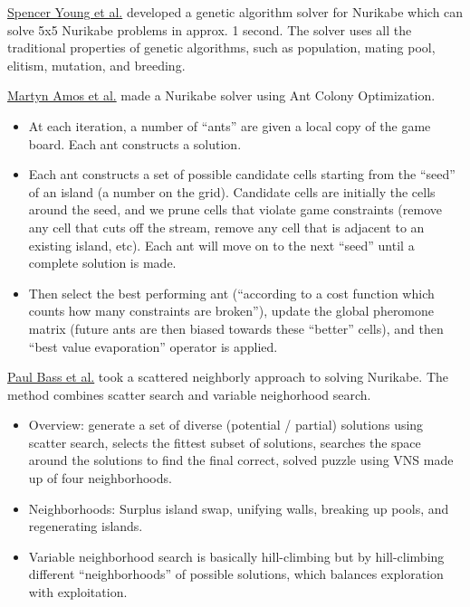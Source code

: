 \documentclass{article}
\theoremstyle{definition}
\begin{document}
\hyperlink{http://www.spenceryoungcs.com/nurikabeGA.html}{Spencer Young et al.} developed a genetic algorithm solver for Nurikabe which can solve 5x5 Nurikabe problems in approx. 1 second. The solver uses all the traditional properties of genetic algorithms, such as population, mating pool, elitism, mutation, and breeding.

\hyperlink{https://dl.acm.org/doi/10.1145/3319619.3338470}{Martyn Amos et al.} made a Nurikabe solver using Ant Colony Optimization. 
\begin{itemize}
  \item At each iteration, a number of “ants” are given a local copy of the game board. Each ant constructs a solution.
  \item Each ant constructs a set of possible candidate cells starting from the “seed” of an island (a number on the grid). Candidate cells are initially the cells around the seed, and we prune cells that violate game constraints (remove any cell that cuts off the stream, remove any cell that is adjacent to an existing island, etc). Each ant will move on to the next “seed” until a complete solution is made.
  \item Then select the best performing ant (“according to a cost function which counts how many constraints are broken”), update the global pheromone matrix (future ants are then biased towards these “better” cells), and then “best value evaporation” operator is applied.
\end{itemize}

\hyperlink{https://dl.acm.org/doi/pdf/10.5555/3447286.3447294}{Paul Bass et al.} took a scattered neighborly approach to solving Nurikabe. The method combines scatter search and variable neighorhood search. 
\begin{itemize}
    \item Overview: generate a set of diverse (potential / partial) solutions using scatter search, selects the fittest subset of solutions, searches the space around the solutions to find the final correct, solved puzzle using VNS made up of four neighborhoods.
    \item Neighborhoods: Surplus island swap, unifying walls, breaking up pools, and regenerating islands.
    \item Variable neighborhood search is basically hill-climbing but by hill-climbing different “neighborhoods” of possible solutions, which balances exploration with exploitation.
\end{itemize}
\end{document}

